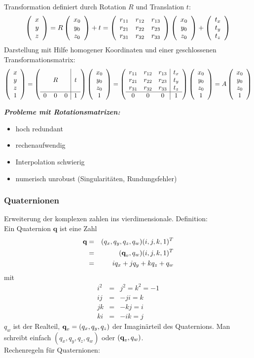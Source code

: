 Transformation definiert durch Rotation $R$ und Translation $t$:
$$\left( \begin{array}{c} x \\ y \\ z \end{array} \right) = R \left( \begin{array}{c} x_0 \\ y_0 \\ z_0 \end{array} \right) + t = \left( \begin{array}{ccc} r_{11} & r_{12} & r_{13} \\ r_{21} & r_{22} & r_{23} \\ r_{31} & r_{32} & r_{33} \end{array} \right) \left( \begin{array}{c} x_0 \\ y_0 \\ z_0 \end{array} \right) + \left( \begin{array}{c} t_x \\ t_y \\ t_z \end{array} \right)$$
Darstellung mit Hilfe homogener Koordinaten und einer geschlossenen Transformationsmatrix:
$$\left( \begin{array}{c} x \\ y \\ z \\ 1 \end{array} \right) = \left( \begin{array}{ccc|c} &&& \\ & R && t \\ &&& \\ \hline 0 & 0 & 0 & 1 \end{array} \right) \left( \begin{array}{c} x_0 \\ y_0 \\ z_0 \\ 1 \end{array} \right) = \left( \begin{array}{ccc|c} r_{11} & r_{12} & r_{13} & t_x \\ r_{21} & r_{22} & r_{23} & t_y \\ r_{31} & r_{32} & r_{33} & t_z \\ \hline 0 & 0 & 0 & 1 \end{array} \right) \left( \begin{array}{c} x_0 \\ y_0 \\ z_0 \\ 1 \end{array} \right) = A \left( \begin{array}{c} x_0 \\ y_0 \\ z_0 \\ 1 \end{array} \right)$$

\textbf{\textsl{Probleme mit Rotationsmatrizen:}}
\begin{itemize}
\item hoch redundant
\item rechenaufwendig
\item Interpolation schwierig
\item numerisch unrobust (Singularitäten, Rundungsfehler)
\end{itemize}

\subsubsection*{Quaternionen}

Erweiterung der komplexen zahlen ins vierdimensionale. Definition: \\[0,1cm]
Ein Quaternion $\textbf{q}$ ist eine Zahl
\begin{eqnarray*}
\textbf{q} &=& (q_x,q_y,q_z,q_w)(i,j,k,1)^T \\ &=& (\textbf{q}_v,q_w)(i,j,k,1)^T \\ &=& iq_x + jq_y + kq_z + q_w
\end{eqnarray*}
mit
\begin{eqnarray*}
i^2 &=& j^2 = k^2 = -1 \\ ij &=& -ji = k \\ jk &=& -kj = i \\ ki &=& -ik = j
\end{eqnarray*}
$q_w$ ist der Realteil, $\textbf{q}_v = (q_x,q_y,q_z)$ der Imaginärteil des Quaternions. Man schreibt einfach $(q_x,q_y,q_z,q_w)$ oder $(\textbf{q}_v,q_w)$. \\[0,1cm]
Rechenregeln für Quaternionen:

